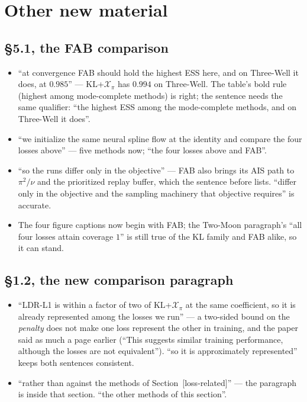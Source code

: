 \documentclass[11pt]{article}
\newcommand{\KL}{\mathrm{KL}}
\newcommand{\X}{\mathcal X}
\begin{document}
\section{Other new material}

\subsection{\S5.1, the FAB comparison}

\begin{itemize}[leftmargin=*,itemsep=2pt]
\item ``at convergence FAB should hold the highest ESS here, and on Three-Well
      it does, at $0.985$'' --- $\KL$+$\X_\pi$ has $0.994$ on Three-Well. The
      table's bold rule (highest among mode-complete methods) is right; the
      sentence needs the same qualifier: ``the highest ESS among the
      mode-complete methods, and on Three-Well it does''.
\item ``we initialize the same neural spline flow at the identity and compare
      the four losses above'' --- five methods now; ``the four losses above and
      FAB''.
\item ``so the runs differ only in the objective'' --- FAB also brings its AIS
      path to $\pi^2/\nu$ and the prioritized replay buffer, which the
      sentence before lists. ``differ only in the objective and the sampling
      machinery that objective requires'' is accurate.
\item The four figure captions now begin with FAB; the Two-Moon paragraph's
      ``all four losses attain coverage $1$'' is still true of the KL family
      and FAB alike, so it can stand.
\end{itemize}

\subsection{\S1.2, the new comparison paragraph}

\begin{itemize}[leftmargin=*,itemsep=2pt]
\item ``LDR-L1 is within a factor of two of $\KL$+$\X_\pi$ at the same
      coefficient, so it is already represented among the losses we run'' ---
      a two-sided bound on the \emph{penalty} does not make one loss represent
      the other in training, and the paper said as much a page earlier (``This
      suggests similar training performance, although the losses are not
      equivalent''). ``so it is approximately represented'' keeps both
      sentences consistent.
\item ``rather than against the methods of Section~[loss-related]'' --- the
      paragraph is inside that section. ``the other methods of this section''.
\end{itemize}
\end{document}
